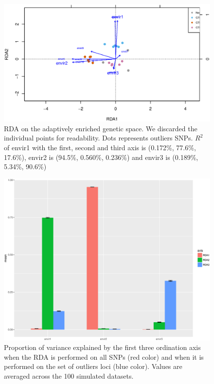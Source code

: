 \documentclass[a4paper,times,10pt,authoryear]{article}%
\begin{document}
\begin{figure}[t]
\begin{center}
\includegraphics[height=0.4\textheight]{figures/rdaA.eps}
\end{center}
\caption{RDA on the adaptively enriched genetic space. We discarded the individual points for readability. Dots represents outliers SNPs.  $R^2$ of envir1 with the first, second and third axis is (0.172\%, 77.6\%, 17.6\%), envir2 is (94.5\%, 0.560\%, 0.236\%) and envir3 is (0.189\%, 5.34\%, 90.6\%)}%
\label{fig:rdaA}%
\end{figure}

\begin{figure}[t]
\begin{center}
\includegraphics[height=0.4\textheight]{figures/R2.eps}
\end{center}
\caption{Proportion of variance explained by the first three ordination axis when the RDA is performed on all SNPs (red color) and when it is performed on the set of outliers loci (blue color). Values are averaged across the 100 simulated datasets.}%
\label{fig:R2}%
\end{figure}
\end{document}
